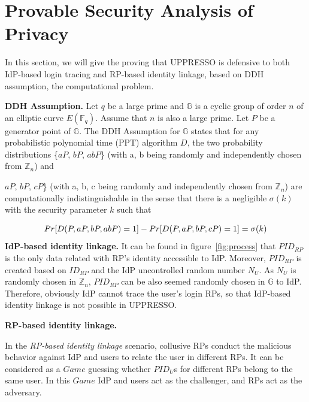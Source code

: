 \section{Provable Security Analysis of Privacy}
\label{sec:privacy}


In this section, we will give the proving that UPPRESSO is defensive to both IdP-based login tracing and RP-based identity linkage, based on DDH assumption\cite{GoldwasserK16}, the computational problem. 


\noindent\textbf{DDH Assumption.}
Let $q$ be a large prime and
$\mathbb{G}$ is a  cyclic group of order $n$ of an elliptic curve $E(\mathbb{F}_q)$. 
Assume that $n$ is also a large prime. Let $P$ be a generator point of $\mathbb{G}$. The DDH Assumption for $\mathbb{G}$ states that for any probabilistic polynomial time (PPT) algorithm $D$, the two probability distributions \{$aP$, $bP$, $abP$\} (with a, b being randomly and independently chosen from $\mathbb{Z}_n$) and\ {$aP$, $bP$, $cP$\} (with a, b, c being randomly and independently chosen from $\mathbb{Z}_n$) are computationally indistinguishable in the sense that there is a negligible $\sigma(k)$ with the security parameter $k$ such that
\vspace{-\topsep}
\begin{multline*}
Pr[D(P, aP, bP, abP)=1]-Pr[D(P, aP, bP, cP)=1]=\sigma(k)
\vspace{-\topsep}
\end{multline*}

\noindent\textbf{IdP-based identity linkage.} 
It can be found in figure~\ref{fig:process} that $PID_{RP}$ is the only data related with RP's identity accessible to IdP. Moreover, $PID_{RP}$ is created based on $ID_{RP}$ and the IdP uncontrolled random number $N_U$. As $N_U$ is randomly chosen in $\mathbb{Z}_n$,  $PID_{RP}$ can be also seemed  randomly chosen in $\mathbb{G}$ to IdP. Therefore, obviously IdP cannot trace the user's login RPs, so that IdP-based identity linkage is not possible in UPPRESSO.

\noindent\textbf{RP-based identity linkage.} 

In the \emph{RP-based identity linkage} scenario, collusive RPs conduct the malicious behavior against IdP and users to relate the user in different RPs. It can be considered as a $Game$ guessing whether $PID_U$s for different RPs belong to the same user.  In this $Game$ IdP and users act as the challenger, and RPs act as the adversary. 

}
